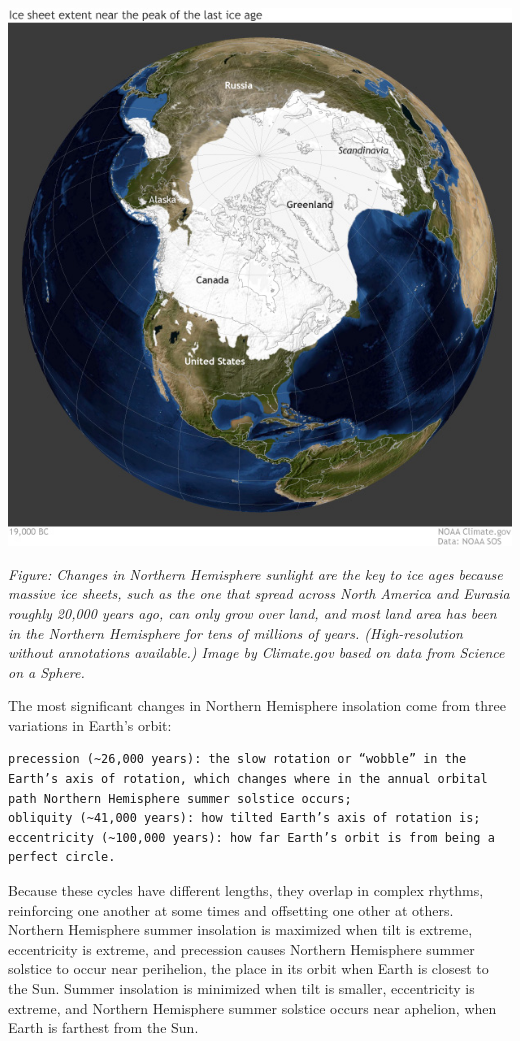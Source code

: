\documentclass[
]{book}
\begin{document}
\includegraphics{fig/GlacialMax.jpg}

\emph{Figure: Changes in Northern Hemisphere sunlight are the key to ice ages because massive ice sheets, such as the one that spread across North America and Eurasia roughly 20,000 years ago, can only grow over land, and most land area has been in the Northern Hemisphere for tens of millions of years. (High-resolution without annotations available.) Image by Climate.gov based on data from Science on a Sphere.}

The most significant changes in Northern Hemisphere insolation come from three variations in Earth's orbit:

\begin{verbatim}
precession (~26,000 years): the slow rotation or “wobble” in the Earth’s axis of rotation, which changes where in the annual orbital path Northern Hemisphere summer solstice occurs;
obliquity (~41,000 years): how tilted Earth’s axis of rotation is;
eccentricity (~100,000 years): how far Earth’s orbit is from being a perfect circle.
\end{verbatim}

Because these cycles have different lengths, they overlap in complex rhythms, reinforcing one another at some times and offsetting one other at others. Northern Hemisphere summer insolation is maximized when tilt is extreme, eccentricity is extreme, and precession causes Northern Hemisphere summer solstice to occur near perihelion, the place in its orbit when Earth is closest to the Sun. Summer insolation is minimized when tilt is smaller, eccentricity is extreme, and Northern Hemisphere summer solstice occurs near aphelion, when Earth is farthest from the Sun.
\end{document}
